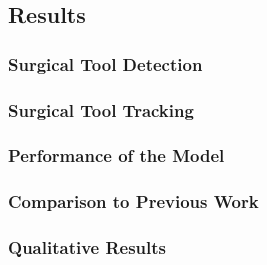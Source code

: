 \subsection{Results}


\subsubsection{Surgical Tool Detection}



\subsubsection{Surgical Tool Tracking}



\subsubsection{Performance of the Model}




\subsubsection{Comparison to Previous Work}

\subsubsection{Qualitative Results}

